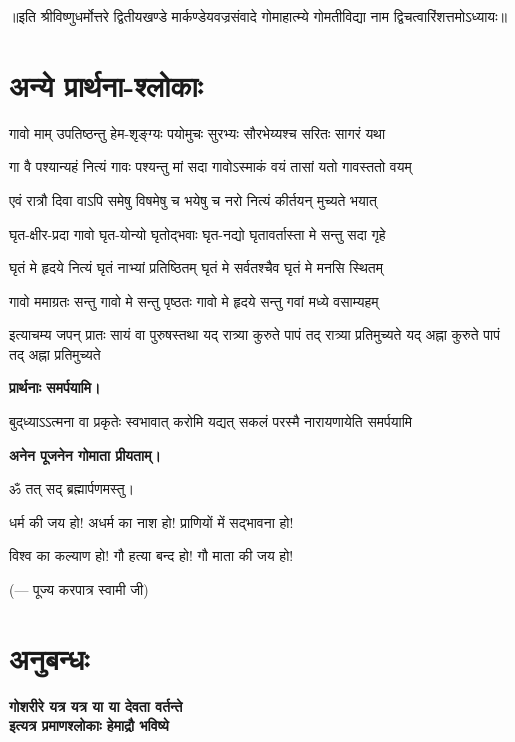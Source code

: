 \begin{center}
॥इति श्रीविष्णुधर्मोत्तरे द्वितीयखण्डे मार्कण्डेयवज्रसंवादे गोमाहात्म्ये गोमतीविद्या नाम द्विचत्वारिंशत्तमोऽध्यायः॥

\section{अन्ये प्रार्थना-श्लोकाः}
\twolineshloka
{गावो माम् उपतिष्ठन्तु हेम-शृङ्ग्यः पयोमुचः}
{सुरभ्यः सौरभेय्यश्च सरितः सागरं यथा}

\twolineshloka
{गा वै पश्यान्यहं नित्यं गावः पश्यन्तु मां सदा}
{गावोऽस्माकं वयं तासां यतो गावस्ततो वयम्}

\twolineshloka
{एवं रात्रौ दिवा वाऽपि समेषु विषमेषु च}
{भयेषु च नरो नित्यं कीर्तयन् मुच्यते भयात्}

\twolineshloka
{घृत-क्षीर-प्रदा गावो घृत-योन्यो घृतोद्भवाः}
{घृत-नद्यो घृतावर्तास्ता मे सन्तु सदा गृहे}

\twolineshloka
{घृतं मे हृदये नित्यं घृतं नाभ्यां प्रतिष्ठितम्}
{घृतं मे सर्वतश्चैव घृतं मे मनसि स्थितम्}

\twolineshloka
{गावो ममाग्रतः सन्तु गावो मे सन्तु पृष्ठतः}
{गावो मे हृदये सन्तु गवां मध्ये वसाम्यहम्}

\threelineshloka
{इत्याचम्य जपन् प्रातः सायं वा पुरुषस्तथा}
{यद् रात्र्या कुरुते पापं तद् रात्र्या प्रतिमुच्यते}
{यद् अह्ना कुरुते पापं तद् अह्ना प्रतिमुच्यते}

\textbf{\devAya{} प्रार्थनाः समर्पयामि।}

{बुद्‌ध्याऽऽत्मना वा प्रकृतेः स्वभावात्}
{करोमि यद्यत् सकलं परस्मै}
{नारायणायेति समर्पयामि}

\medskip

\centerline{\textbf{अनेन पूजनेन गोमाता प्रीयताम्।}}

\medskip

ॐ तत् सद् ब्रह्मार्पणमस्तु।

\medskip

धर्म की जय हो! अधर्म का नाश हो! प्राणियों में सद्भावना हो!

विश्व का कल्याण हो! गौ हत्या बन्द हो! गौ माता की जय हो!

\hfill\small{(\textsf{—} पूज्य करपात्र स्वामी जी)}

\end{center}

\section{अनुबन्धः}
{\centering \textbf{गोशरीरे यत्र यत्र या या देवता वर्तन्ते\\ इत्यत्र प्रमाणश्लोकाः हेमाद्रौ भविष्ये\\
}}

